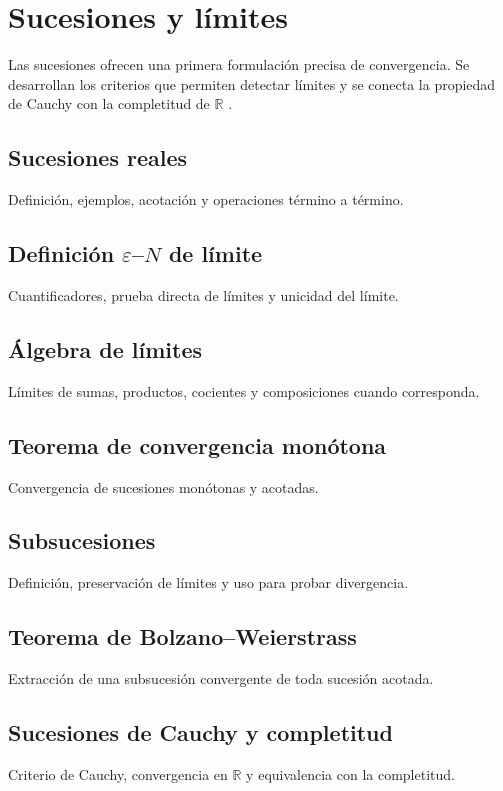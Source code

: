 \chapter{Sucesiones y límites}
\label{cap:sucesiones-limites}

Las sucesiones ofrecen una primera formulación precisa de convergencia. Se desarrollan los criterios que permiten detectar límites y se conecta la propiedad de Cauchy con la completitud de $\mathbb{R}$ \cite{abbott2015,rudin1976}.

\section{Sucesiones reales}
Definición, ejemplos, acotación y operaciones término a término.

\section{Definición \texorpdfstring{$\varepsilon$--$N$}{epsilon--N} de límite}
Cuantificadores, prueba directa de límites y unicidad del límite.

\section{Álgebra de límites}
Límites de sumas, productos, cocientes y composiciones cuando corresponda.

\section{Teorema de convergencia monótona}
Convergencia de sucesiones monótonas y acotadas.

\section{Subsucesiones}
Definición, preservación de límites y uso para probar divergencia.

\section{Teorema de Bolzano--Weierstrass}
Extracción de una subsucesión convergente de toda sucesión acotada.

\section{Sucesiones de Cauchy y completitud}
Criterio de Cauchy, convergencia en $\mathbb{R}$ y equivalencia con la completitud.
